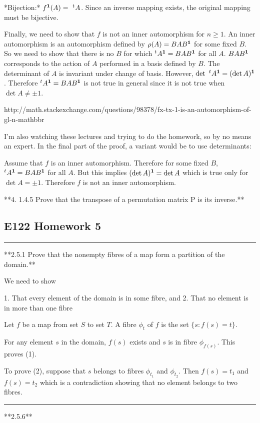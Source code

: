 *Bijection:* $f^{\mathbf 1}(A) =~ ^tA$. Since an inverse mapping exists, the original
mapping must be bijective.

Finally, we need to show that $f$ is not an inner automorphism for $n \geq
1$. An inner automorphism is an automorphism defined by $\rho(A) = BAB^{\mathbf 1}$ for
some fixed $B$. So we need to show that there is no $B$ for which $^tA^{\mathbf 1} =
BAB^{\mathbf 1}$ for all $A$. $BAB^{\mathbf 1}$ corresponds to the action of $A$ performed in a
basis defined by $B$. The determinant of $A$ is invariant under change of
basis. However, $\det ~^tA^{\mathbf 1} = (\det A)^{\mathbf 1}$. Therefore $^tA^{\mathbf 1} = BAB^{\mathbf 1}$ is
not true in general since it is not true when $\det A \neq \pm 1$.

http://math.stackexchange.com/questions/98378/fx-tx-1-is-an-automorphism-of-gl-n-mathbbr

I'm also watching these lectures and trying to do the homework, so by no means
an expert. In the final part of the proof, a variant would be to use
determinants:

Assume that $f$ is an inner automorphism. Therefore for some fixed $B$, $^tA^{\mathbf 1}
= BAB^{\mathbf 1}$ for all $A$. But this implies $(\det A)^{\mathbf 1} = \det A$ which is true
only for $\det A = \pm 1$. Therefore $f$ is not an inner automorphism.


**4. 1.4.5 Prove that the transpose of a permutation matrix P is its inverse.**

\subsection{E122 Homework 5}
\hrule

**2.5.1 Prove that the nonempty fibres of a map form a partition of the domain.**

We need to show

1. That every element of the domain is in some fibre, and
2. That no element is in more than one fibre

Let $f$ be a map from set $S$ to set $T$. A fibre $\phi_t$ of $f$ is the set
$\{s: f(s) = t\}$.

For any element $s$ in the domain, $f(s)$ exists and $s$ is in fibre
$\phi_{f(s)}$. This proves (1).

To prove (2), suppose that $s$ belongs to fibres $\phi_{t_1}$ and
$\phi_{t_2}$. Then $f(s) = t_1$ and $f(s) = t_2$ which is a contradiction
showing that no element belongs to two fibres.

\hrule

**2.5.6**


